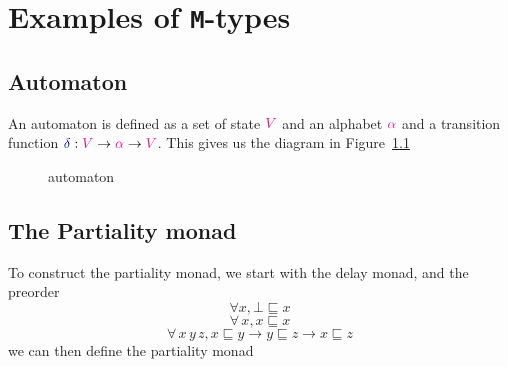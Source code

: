 \documentclass[twoside,11pt,openright]{report}
\theoremstyle{plain} %
\theoremstyle{definition}
\theoremstyle{remark}
\newcommand*{\figref}[1]{Figure~\ref{fig:#1}}
\newcommand*{\type}[1]{\textcolor{magenta!90!black}{#1}}
\newcommand*{\function}[1]{\textcolor{blue!60!black}{\ensuremath{\mathtt{#1}}}}
\begin{document}

\chapter{Examples of \texttt{M}-types}

\section{Automaton}
An automaton is defined as a set of state \(\type{V}\) and an alphabet \(\type{\alpha}\) and a transition function \(\function{\delta} : \type{V} \rightarrow \type{\alpha} \rightarrow \type{V}\). This gives us the diagram in \figref{automaton}
\begin{figure}[h]
  \centering
  \caption{automaton}
  \label{fig:automaton}
\end{figure}

\section{The Partiality monad}
To construct the partiality monad, we start with the delay monad, and the preorder
\begin{equation}
\forall x, \bot \sqsubseteq x
\end{equation}
\begin{equation}
\forall\,x, x \sqsubseteq x
\end{equation}
\begin{equation}
\forall\,x\,y\,z, x \sqsubseteq y \rightarrow y \sqsubseteq z \rightarrow x \sqsubseteq z
\end{equation}
we can then define the partiality monad
\end{document}
